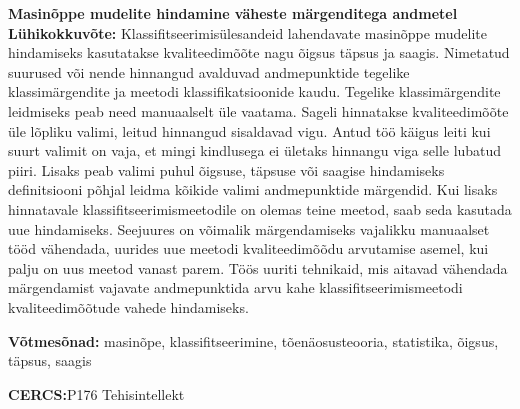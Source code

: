 
\noindent\textbf{\large Masinõppe mudelite hindamine väheste märgenditega andmetel}
\vspace*{1ex}
\noindent\textbf{Lühikokkuvõte:} 
\noindent
Klassifitseerimisülesandeid lahendavate masinõppe mudelite hindamiseks kasutatakse kvaliteedimõõte nagu õigsus täpsus ja saagis. Nimetatud suurused või nende hinnangud avalduvad andmepunktide tegelike klassimärgendite ja meetodi klassifikatsioonide kaudu. Tegelike klassimärgendite leidmiseks peab need manuaalselt üle vaatama. Sageli hinnatakse kvaliteedimõõte üle lõpliku valimi, leitud hinnangud sisaldavad vigu. Antud töö käigus leiti kui suurt valimit on vaja, et mingi kindlusega ei ületaks hinnangu viga selle lubatud piiri. Lisaks peab valimi puhul õigsuse, täpsuse või saagise hindamiseks definitsiooni põhjal leidma kõikide valimi andmepunktide märgendid. Kui lisaks hinnatavale klassifitseerimismeetodile on olemas teine meetod, saab seda kasutada uue hindamiseks. Seejuures on võimalik märgendamiseks vajalikku manuaalset tööd vähendada, uurides uue meetodi kvaliteedimõõdu arvutamise asemel, kui palju on uus meetod vanast parem. Töös uuriti tehnikaid, mis aitavad vähendada märgendamist vajavate andmepunktida arvu kahe klassifitseerimismeetodi kvaliteedimõõtude vahede hindamiseks.
\vspace*{1ex}

\noindent\textbf{Võtmesõnad:} masinõpe, klassifitseerimine, tõenäosusteooria, statistika, õigsus, täpsus, saagis
\vspace*{1ex}

\noindent\textbf{CERCS:}P176 Tehisintellekt
\vspace*{3ex}


